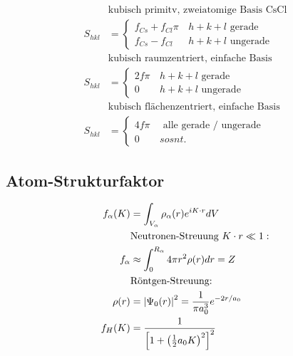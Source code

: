 \begin{equation*}
    \begin{aligned}
        &\text{kubisch primitv, zweiatomige Basis CsCl} \\
        S_{hkl} &= \begin{cases}
            f_{Cs} + f_{Cl} \pi & \, h+k+l \text{ gerade} \\
            f_{Cs} - f_{Cl} & \, h+k+l \text{ ungerade}
            \end{cases} \\
        &\text{kubisch raumzentriert, einfache Basis} \\
        S_{hkl} &= \begin{cases}
            2f \pi & \, h+k+l \text{ gerade} \\
            0 & \, h+k+l \text{ ungerade}
            \end{cases} \\
        &\text{kubisch flächenzentriert, einfache Basis} \\
        S_{hkl} &= \begin{cases}
            4f \pi & \, \text{ alle gerade / ungerade} \\
            0 & \, sosnt.
            \end{cases}
    \end{aligned}
\end{equation*}

\subsection*{Atom-Strukturfaktor}

\begin{equation*}
    \begin{aligned}
        f_\alpha  (K) &= \int_{V_\alpha} \rho_{\alpha} (r) e^{i K \cdot r} dV \\
        & \text{Neutronen-Streuung } K\cdot r \ll 1: \\
        f_{\alpha} &\approx \int_0^{R_\alpha} 4 \pi r^2 \rho(r) dr = Z \\
        & \text{Röntgen-Streuung:} \\
        \rho(r) &= \left\vert\Psi_0(r)\right\vert^2 = \frac{1}{\pi a_0^3} e^{-2r/a_0} \\
        f_H(K) &= \frac{1}{\left[1+ \left(\frac{1}{2}a_0K\right)^2\right]^2}
    \end{aligned}
\end{equation*}

